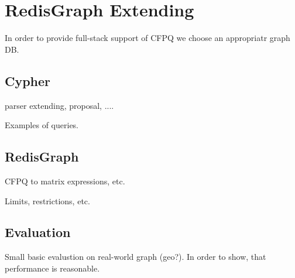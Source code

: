 \section{RedisGraph Extending}

In order to provide full-stack support of CFPQ we choose an appropriatr graph DB.



\subsection{Cypher}

parser extending, proposal, ....

Examples of queries.

\subsection{RedisGraph}

CFPQ to matrix expressions, etc. 

Limits, restrictions, etc.

\subsection{Evaluation}

Small basic evalustion on real-world graph (geo?).
In order to show, that performance is reasonable.